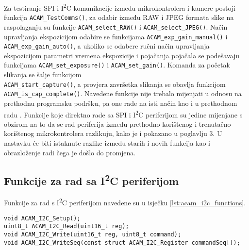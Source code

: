 \noindent Za testiranje SPI i I\textsuperscript{2}C komunikacije između mikrokontrolera i kamere postoji funkcija \verb|ACAM_TestComms()|, za odabir između RAW i JPEG formata slike na raspolaganju su funkcije \verb|ACAM_select_RAW()| i \verb|ACAM_select_JPEG()|. Način upravljanja ekspozicijom odabire se funkcijama \verb|ACAM_exp_gain_manual()| i \\ \verb|ACAM_exp_gain_auto()|, a ukoliko se odabere ručni način upravljanja ekspozicijom parametri vremena ekspozicije i pojačanja pojačala se podešavaju funkcijama \verb|ACAM_set_exposure()| i \verb|ACAM_set_gain()|. Komanda za početak slikanja se šalje funkcijom \\ \verb|ACAM_start_capture()|, a provjera završetka slikanja se obavlja funkcijom \\ \verb|ACAM_is_cap_complete()|. Navedene funkcije nije trebalo mijenjati u odnosu na prethodnu programsku podršku, pa one rade na isti način kao i u prethodnom radu \cite{diplomski_goran_petrak}. Funkcije koje direktno rade sa SPI i I\textsuperscript{2}C periferijom su jedine mijenjane s obzirom na to da se rad periferija između prethodno korištenog i trenutačno korištenog mikrokontrolera razlikuju, kako je i pokazano u poglavlju 3. U nastavku će biti istaknute razlike između starih i novih funkcija kao i obrazloženje radi čega je došlo do promjena.

\subsection{Funkcije za rad sa I\textsuperscript{2}C periferijom}

Funkcije za rad s I\textsuperscript{2}C periferijom navedene su u isječku \ref{lst:acam_i2c_functions}.

\begin{lstlisting}[caption=Funkcije za rad s I\textsuperscript{2}C periferijom, label={lst:acam_i2c_functions}]
void ACAM_I2C_Setup();
uint8_t ACAM_I2C_Read(uint16_t reg);
void ACAM_I2C_Write(uint16_t reg, uint8_t command);
void ACAM_I2C_WriteSeq(const struct ACAM_I2C_Register commandSeq[]);
\end{lstlisting}

